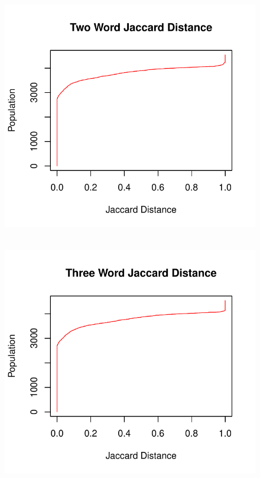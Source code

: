 \documentclass[12pt]{article}
\begin{document}
\begin{figure}[H]
    \centering
    \includegraphics[scale=0.7]{twoDiff.pdf}
\end{figure}

\begin{figure}[H]
    \centering
    \includegraphics[scale=0.7]{threeDiff.pdf}
\end{figure}
\end{document}

